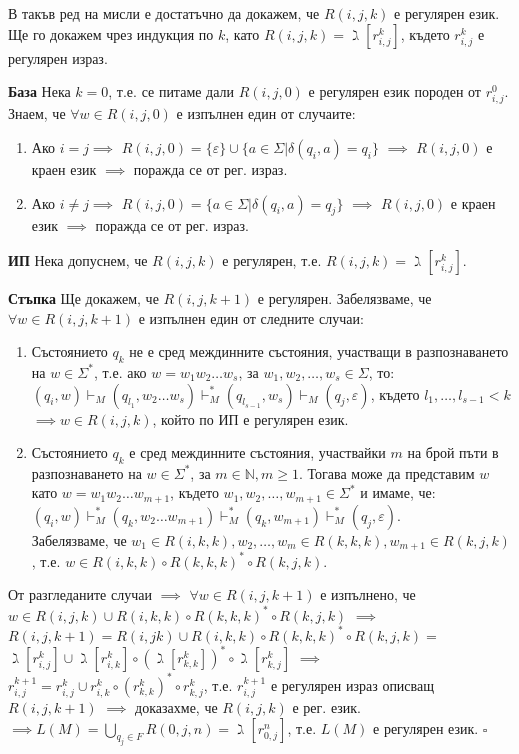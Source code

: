 \documentclass[fleqn,12pt]{article}
\begin{document}
\begin{flushleft}
В такъв ред на мисли е достатъчно да докажем, че $R(i, j, k)$ е регулярен език. Ще го докажем чрез индукция по $k$, като $R(i, j, k) = \gimel[r_{i, j}^k]$, където $r_{i, j}^k$ е регулярен израз.

\textbf{База} Нека $k = 0$, т.е. се питаме дали $R(i, j, 0)$ е регулярен език породен от $r_{i, j}^0$. Знаем, че $\forall w \in R(i, j, 0)$ е изпълнен един от случаите:
\begin{enumerate}
    \item Ако $i = j \implies$ $R(i, j, 0) = \{\varepsilon\} \cup \{a \in \Sigma | \delta(q_i, a) = q_i\}$ $\implies$ $R(i, j, 0)$ е краен език $\implies$ поражда се от рег. израз.
    \item Ако $i \neq j \implies$ $R(i, j, 0) = \{a \in \Sigma | \delta(q_i, a) = q_j\}$ $\implies$ $R(i, j, 0)$ е краен език $\implies$ поражда се от рег. израз.
\end{enumerate}

\textbf{ИП} Нека допуснем, че $R(i, j, k)$ е регулярен, т.е. $R(i, j, k) = \gimel[r_{i, j}^k]$.

\textbf{Стъпка} Ще докажем, че $R(i, j, k+1)$ е регулярен. Забелязваме, че $\forall w \in R(i, j, k+1)$ е изпълнен един от следните случаи:
\begin{enumerate}
    \item Състоянието $q_k$ не е сред междинните състояния, участващи в разпознаването на $w \in \Sigma^*$, т.е. ако $w = w_1w_2{\dots}w_s$, за $w_1, w_2, \dots, w_s \in \Sigma$, то: \\
    $(q_i, w) \vdash_M (q_{l_1}, w_2{\dots}w_s) \vdash_M^* (q_{l_{s-1}}, w_s) \vdash_M (q_j, \varepsilon)$, където ${l_1}, \dots, {l_{s-1}} < k$ $\implies w \in R(i, j, k)$, който по ИП е регулярен език.
    \item Състоянието $q_k$ е сред междинните състояния, участвайки $m$ на брой пъти в разпознаването на $w \in \Sigma^*$, за $m \in \mathbb{N}, m \geq 1$. Тогава може да представим $w$ като $w = w_1w_2{\dots}w_{m+1}$, където $w_1, w_2, \dots, w_{m+1} \in \Sigma^*$ и имаме, че: \\
    $(q_i, w) \vdash_M^* (q_k, w_2{\dots}w_{m+1}) \vdash_M^* (q_k, w_{m+1}) \vdash_M^* (q_j, \varepsilon)$. \\
    Забелязваме, че $w_1 \in R(i, k, k), w_2, \dots, w_m \in R(k, k, k), w_{m+1} \in R(k, j, k)$, т.е. $w \in R(i, k, k) \circ R(k, k, k)^* \circ R(k, j, k)$.
\end{enumerate}

От разгледаните случаи $\implies$ $\forall w \in R(i, j, k+1)$ е изпълнено, че $w \in R(i, j, k) \cup R(i, k, k) \circ R(k, k, k)^* \circ R(k, j, k)$ $\implies$ $R(i, j, k+1) = R(i, j k) \cup R(i, k, k) \circ R(k, k, k)^* \circ R(k, j, k) =$$\gimel[r_{i, j}^k] \cup \gimel[r_{i, k}^k] \circ (\gimel[r_{k, k}^k])^* \circ \gimel[r_{k, j}^k]$ $\implies$ $r_{i, j}^{k+1} = r_{i, j}^k \cup r_{i, k}^{k} \circ (r_{k, k}^{k})^* \circ r_{k, j}^{k}$, т.е. $r_{i, j}^{k+1}$ е регулярен израз описващ $R(i, j, k+1)$ $\implies$ доказахме, че $R(i, j, k)$ е рег. език. \\
$\implies L(M) = \bigcup\limits_{q_j \in F} R(0, j, n) = \gimel[r_{0, j}^n]$, т.е. $L(M)$ е регулярен език. $\square$


\end{flushleft}
\end{document}
